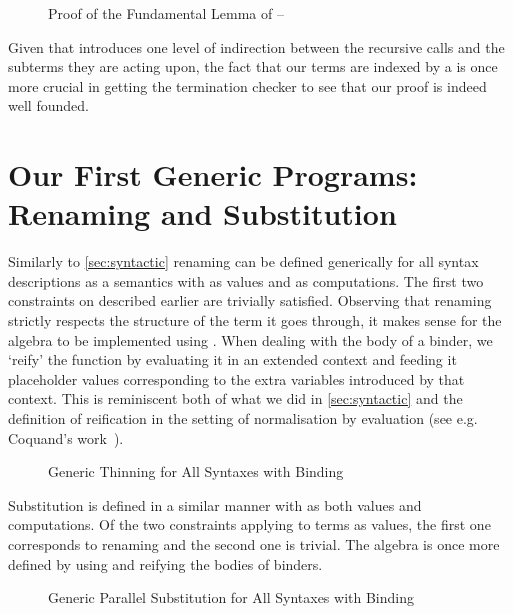 \begin{figure}[h]
\caption{Proof of the Fundamental Lemma of  -- }
\end{figure}

Given that  introduces one level of indirection between the recursive
calls and the subterms they are acting upon, the fact that our terms are indexed
by a  is once more crucial in getting the termination checker to see
that our proof is indeed well founded.

\section{Our First Generic Programs: Renaming and Substitution}\label{section:renandsub}

Similarly to \cref{sec:syntactic} renaming can be defined generically for all syntax
descriptions as a semantics with  as values and  as computations. The
first two constraints on  described earlier are trivially satisfied. Observing
that renaming strictly respects the structure of the term it goes through, it makes
sense for the algebra to be implemented using . When dealing with the body
of a binder, we `reify' the  function by evaluating it in an extended
context and feeding it placeholder values corresponding to the extra variables
introduced by that context. This is reminiscent both of what we did in
\cref{sec:syntactic} and the definition of reification in the setting of normalisation
by evaluation (see e.g. Coquand's work~\citeyear{coquand2002formalised}).

\begin{figure}[h]
\caption{Generic Thinning for All Syntaxes with Binding\label{fig:genren}}
\end{figure}

Substitution is defined in a similar manner with  as both values and computations.
Of the two constraints applying to terms as values, the first one corresponds to renaming
and the second one is trivial. The algebra is once more defined by using  and
reifying the bodies of binders.

\begin{figure}[h]
\caption{Generic Parallel Substitution for All Syntaxes with Binding}
\end{figure}

